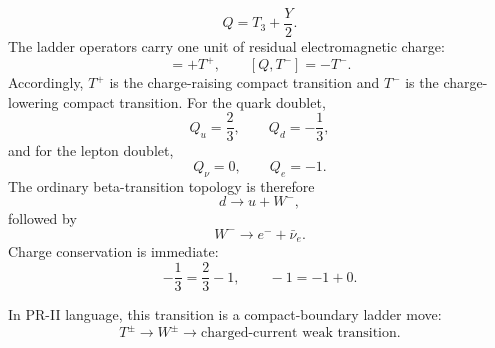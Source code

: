 \documentclass[11pt]{article}
\begin{document}
\begin{equation}
\boxed{
Q
=
T_3+\frac{Y}{2}.
}
\end{equation}
The ladder operators carry one unit of residual electromagnetic charge:
\begin{equation}
[Q,T^+]=+T^+,
\qquad
[Q,T^-]=-T^-.
\end{equation}
Accordingly, \(T^+\) is the charge-raising compact transition and \(T^-\) is the charge-lowering compact transition. For the quark doublet,
\begin{equation}
Q_u=\frac23,
\qquad
Q_d=-\frac13,
\end{equation}
and for the lepton doublet,
\begin{equation}
Q_\nu=0,
\qquad
Q_e=-1.
\end{equation}
The ordinary beta-transition topology is therefore
\begin{equation}
\boxed{
d
\rightarrow
u+W^-,
}
\end{equation}
followed by
\begin{equation}
\boxed{
W^-
\rightarrow
e^-+\bar\nu_e.
}
\end{equation}
Charge conservation is immediate:
\begin{equation}
-\frac13
=
\frac23-1,
\qquad
-1=-1+0.
\end{equation}

In PR-II language, this transition is a compact-boundary ladder move:
\begin{equation}
\boxed{
T^\pm
\rightarrow
W^\pm
\rightarrow
\text{charged-current weak transition}.
}
\end{equation}
\end{document}

